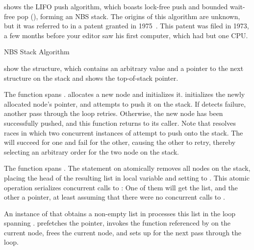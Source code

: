 \begin{fcvref}
shows the LIFO push algorithm, which boasts lock-free push and
bounded wait-free pop (), forming an NBS stack.
The origins of this algorithm are unknown, but it was referred to in
a patent granted in 1975~\cite{PaulJBrown1975LIFOpush}.
This patent was filed in 1973, a few months before your editor
saw his first computer, which had but one CPU\@.

\begin{listing}

\caption{NBS Stack Algorithm}
\label{lst:advsync:NBS Stack Algorithm}
\end{listing}

 show the  structure,
which contains an arbitrary value and a pointer to the next structure
on the stack and
 shows the top-of-stack pointer.

The  function spans .
 allocates a new node and
 initializes it.
 initializes the newly allocated node's 
pointer, and  attempts to push it on the stack.
If  detects  failure, another pass
through the loop retries.
Otherwise, the new node has been successfully pushed, and this function
returns to its caller.
Note that  resolves races in which two concurrent
instances of  attempt to push onto the stack.
The  will succeed for one and fail for the other,
causing the other to retry, thereby selecting an arbitrary order for
the two node on the stack.

The  function spans .
The  statement on  atomically removes
all nodes on the stack, placing the head of the resulting list in local
variable  and setting  to .
This atomic operation serializes concurrent calls to :
One of them will get the list, and the other a  pointer, at
least assuming that there were no concurrent calls to .

An instance of  that obtains a non-empty list in
 processes this list in the loop spanning
.
 prefetches the  pointer,
 invokes the function referenced by  on the
current node,
 frees the current node, and
 sets up  for the next pass through the loop.


\end{fcvref}

